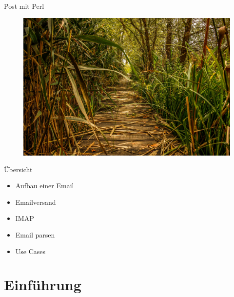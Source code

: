\usepackage{minted}

\date{GPW 2018, Gummersbach, 5. April}


\maketitle

\begin{frame}
  \titlepage
\end{frame}

\cleardoublepage

\tableofcontents

\cleardoublepage


\begin{frame}{Post mit Perl}
  \begin{figure}[!ht]
    \centering
    \includegraphics[width=0.9\linewidth]{img/swamp-1706114_1920.jpg}
  \end{figure}
\end{frame}



\begin{frame}{Übersicht}
  \begin{itemize}
  \item Aufbau einer Email
  \item Emailversand
  \item IMAP
  \item Email parsen
  \item Use Cases  
  \end{itemize}
\end{frame}

\section{Einführung}

